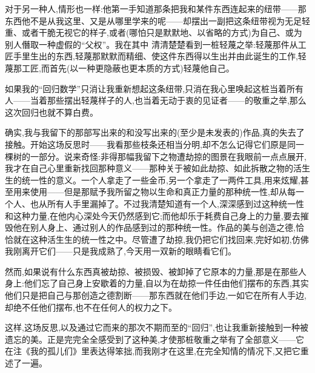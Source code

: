 对于另一种人,情形也一样:他第一手知道那条把我和某件东西连起来的纽带——那东西他不是从我这里、又是从哪里学来的呢——却摆出一副把这条纽带视为无足轻重、或者干脆无视它的样子,或者(哪怕只是默默地、以省略的方式)为自己、或为别人僭取一种虚假的“父权”。我在其中
 清清楚楚看到一桩轻蔑之举:轻蔑那件从工匠手里生出的东西,轻蔑那默默而精细、使这件东西得以生出并由此诞生的工作,轻蔑那工匠,而首先(以一种更隐蔽也更本质的方式)轻蔑他自己。

如果我的“回归数学”只消让我重新想起这条纽带,只消在我心里唤起这桩当着所有人——当着那些摆出轻蔑样子的人,也当着无动于衷的见证者——的敬重之举,那么这次回归也就不算白费。

确实,我与我留下的那部写出来的和没写出来的(至少是未发表的)作品,真的失去了接触。开始这场反思时——我看那些枝条还相当分明,却不怎么记得它们原是同一棵树的一部分。说来奇怪:非得那幅我留下之物遭劫掠的图景在我眼前一点点展开,我才在自己心里重新找回那种意义——那种关于被如此劫掠、如此拆散之物的活生生的统一性的意义。一个人拿走了一些金币,另一个拿走了一两件工具,用来炫耀,甚至用来使用——但是那赋予我所留之物以生命和真正力量的那种统一性,却从每一个人、也从所有人手里漏掉了。不过我清楚知道有一个人,深深感到过这种统一性和这种力量,在他内心深处今天仍然感到它;而他却乐于耗费自己身上的力量,要去摧毁他在别人身上、通过别人的作品感到过的那种统一性。作品的美与创造之德,恰恰就在这种活生生的统一性之中。尽管遭了劫掠,我仍把它们找回来,完好如初,仿佛我刚离开它们——只是我成熟了,今天用一双新的眼睛看它们。

然而,如果说有什么东西真被劫掠、被损毁、被卸掉了它原本的力量,那是在那些人身上:他们忘了自己身上安歇着的力量,自以为在劫掠一件任由他们摆布的东西,其实他们只是把自己与那创造之德割断——那东西就在他们手边,一如它在所有人手边,却绝不任他们摆布,也不在任何人的权力之下。

这样,这场反思,以及通过它而来的那次不期而至的“回归”,也让我重新接触到一种被遗忘的美。正是完完全全感受到了这种美,才使那桩敬重之举有了全部意义——它在注《我的孤儿们》里表达得笨拙,而我刚才在这里,在完全知情的情况下,又把它重述了一遍。

